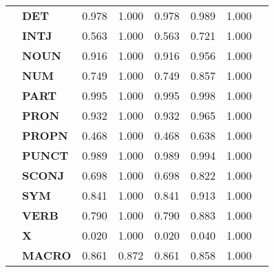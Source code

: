 \begin{longtable}{|l||l||l||l||l||l||l||l|}
\textbf{} & \textbf{DET} & 0.978 & 1.000 & 0.978 & 0.989 & 1.000 \\
\textbf{} & \textbf{INTJ} & 0.563 & 1.000 & 0.563 & 0.721 & 1.000 \\
\textbf{} & \textbf{NOUN} & 0.916 & 1.000 & 0.916 & 0.956 & 1.000 \\
\textbf{} & \textbf{NUM} & 0.749 & 1.000 & 0.749 & 0.857 & 1.000 \\
\textbf{} & \textbf{PART} & 0.995 & 1.000 & 0.995 & 0.998 & 1.000 \\
\textbf{} & \textbf{PRON} & 0.932 & 1.000 & 0.932 & 0.965 & 1.000 \\
\textbf{} & \textbf{PROPN} & 0.468 & 1.000 & 0.468 & 0.638 & 1.000 \\
\textbf{} & \textbf{PUNCT} & 0.989 & 1.000 & 0.989 & 0.994 & 1.000 \\
\textbf{} & \textbf{SCONJ} & 0.698 & 1.000 & 0.698 & 0.822 & 1.000 \\
\textbf{} & \textbf{SYM} & 0.841 & 1.000 & 0.841 & 0.913 & 1.000 \\
\textbf{} & \textbf{VERB} & 0.790 & 1.000 & 0.790 & 0.883 & 1.000 \\
\textbf{} & \textbf{X} & 0.020 & 1.000 & 0.020 & 0.040 & 1.000 \\
\textbf{} & \textbf{MACRO} & 0.861 & 0.872 & 0.861 & 0.858 & 1.000 \\
\cline{1-7}
\end{longtable}
